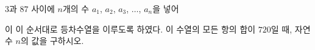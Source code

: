 $3$과 $87$ 사이에 $n$개의 수 $a_1$, $a_2$, $a_3$, $\ldots$, $a_n$을 넣어\par\smallskip{}\par\smallskip\noindent 이 이 순서대로 등차수열을 이루도록 하였다. 이 수열의 모든 항의 합이 $720$일 때, 자연수 $n$의 값을 구하시오.
